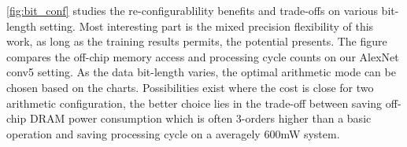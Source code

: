 \begin{table}[h!]
    \caption{TensorRT AlexNet results}
    \label{tab:xnor_result}
    \centering
    \footnotesize 
\end{table}



\autoref{fig:bit_conf} studies the re-configurablility benefits and trade-offs on various bit-length setting. Most interesting part is the mixed precision flexibility of this work, as long as the training results permits, the potential presents. The figure compares the off-chip memory access and processing cycle counts on our AlexNet conv5 setting. As the data bit-length varies, the optimal arithmetic mode can be chosen based on the charts. Possibilities exist where the cost is close for two arithmetic configuration, the better choice lies in the trade-off between saving off-chip DRAM power consumption which is often 3-orders higher than a basic operation and saving processing cycle on a averagely 600mW system.

